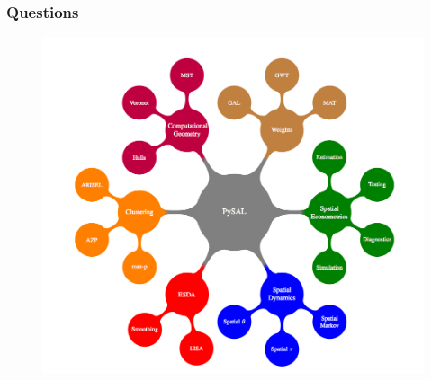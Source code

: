 \documentclass[nototal]{beamer}
\begin{document}
\begin{frame}
	\frametitle{Questions}
  \begin{center}
 \begin{figure}[htbp]
 \includegraphics[width=0.60\linewidth]{pysalGraphic.png}
 \end{figure}
  {}\\
  {}
 \end{center}
 \end{frame} 


\section{} 


\section{}
\end{document}
